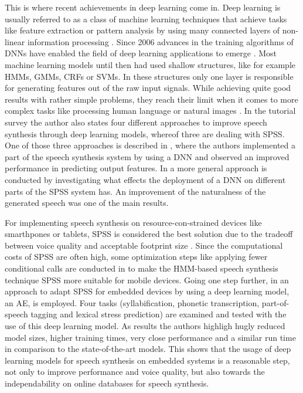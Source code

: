 This is where recent achievements in deep learning come in. Deep learning is usually referred to as a class of machine learning techniques that achieve tasks like feature extraction or pattern analysis by using many connected layers of non-linear information processing \cite{ling:deep, li:survey}. Since 2006 advances in the training algorithms of \acp{DNN} have enabled the field of deep learning applications to emerge \cite{boros:robust}. Most machine learning models until then had used shallow structures, like for example \acp{HMM}, \acp{GMM}, \acp{CRF} or \acp{SVM}. In these structures only one layer is responsible for generating features out of the raw input signals. While achieving quite good results with rather simple problems, they reach their limit when it comes to more complex tasks like processing human language or natural images \cite{li:survey}. In the tutorial survey \cite{li:survey} the author also states four different approaches to improve speech synthesis through deep learning models, whereof three are dealing with \ac{SPSS}. One of those three approaches is described in \cite{zen:deepstatistical}, where the authors implemented a part of the speech synthesis system by using a \ac{DNN} and observed an improved performance in predicting output features. In \cite{hashimoto:effect} a more general approach is conducted by investigating what effects the deployment of a \ac{DNN} on different parts of the \ac{SPSS} system has. An improvement of the naturalness of the generated speech was one of the main results.

For implementing speech synthesis on resource-con-\break strained devices like smarthpones or tablets, \ac{SPSS} is considered the best solution due to the tradeoff between voice quality and acceptable footprint size \cite{toth:optimizing}. Since the computational costs of \ac{SPSS} are often high, some optimization steps like applying fewer conditional calls are conducted in \cite{toth:optimizing} to make the \ac{HMM}-based speech synthesis technique \ac{SPSS} more suitable for mobile devices. Going one step further, in \cite{boros:robust} an approach to adapt \ac{SPSS} for embedded devices by using a deep learning model, an \ac{AE}, is employed. Four tasks (syllabification, phonetic transcription, part-of-speech tagging and lexical stress prediction) are examined and tested with the use of this deep learning model. As results the authors highligh hugly reduced model sizes, higher training times, very close performance and a similar run time in comparison to the state-of-the-art models. This shows that the usage of deep learning models for speech synthesis on embedded systems is a reasonable step, not only to improve performance and voice quality, but also towards the independability on online databases for speech synthesis.

